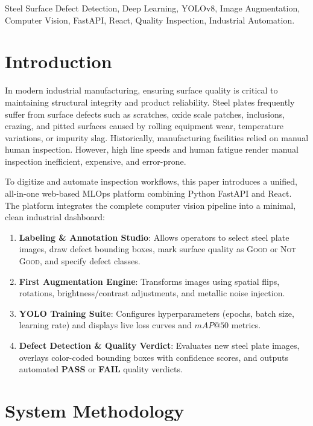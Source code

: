 \documentclass[conference]{IEEEtran}
\begin{document}
\begin{IEEEkeywords}
Steel Surface Defect Detection, Deep Learning, YOLOv8, Image Augmentation, Computer Vision, FastAPI, React, Quality Inspection, Industrial Automation.
\end{IEEEkeywords}

\section{Introduction}
In modern industrial manufacturing, ensuring surface quality is critical to maintaining structural integrity and product reliability. Steel plates frequently suffer from surface defects such as scratches, oxide scale patches, inclusions, crazing, and pitted surfaces caused by rolling equipment wear, temperature variations, or impurity slag. Historically, manufacturing facilities relied on manual human inspection. However, high line speeds and human fatigue render manual inspection inefficient, expensive, and error-prone.

To digitize and automate inspection workflows, this paper introduces a unified, all-in-one web-based MLOps platform combining Python FastAPI and React. The platform integrates the complete computer vision pipeline into a minimal, clean industrial dashboard:
\begin{enumerate}
    \item \textbf{Labeling \& Annotation Studio}: Allows operators to select steel plate images, draw defect bounding boxes, mark surface quality as \textsc{Good} or \textsc{Not Good}, and specify defect classes.
    \item \textbf{First Augmentation Engine}: Transforms images using spatial flips, rotations, brightness/contrast adjustments, and metallic noise injection.
    \item \textbf{YOLO Training Suite}: Configures hyperparameters (epochs, batch size, learning rate) and displays live loss curves and $mAP@50$ metrics.
    \item \textbf{Defect Detection & Quality Verdict}: Evaluates new steel plate images, overlays color-coded bounding boxes with confidence scores, and outputs automated \textbf{PASS} or \textbf{FAIL} quality verdicts.
\end{enumerate}

\section{System Methodology}
\end{document}
